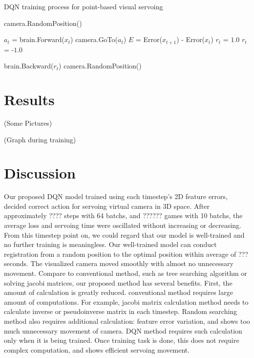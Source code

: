 \documentclass[10pt]{article}
\begin{document}
 \begin{algorithm}
   \caption{DQN training process for point-based visual servoing}\label{euclid}
   \begin{algorithmic}[1]

     \State camera.RandomPosition()



     \State $a_t$ = brain.Forward($x_t$)
     \State camera.GoTo($a_t$)
     \State $E$ = Error($x_{t+1}$) - Error($x_t$)
     \State $r_t$ = $1.0$
     \Else
     \State $r_t$ = -$1.0$
     \EndIf

     brain.Backward($r_t$)
     camera.RandomPosition()
     \EndIf

     \EndFor

   \end{algorithmic}
 \end{algorithm}


\section{Results}
(Some Pictures)

(Graph during training)



\section{Discussion}
 Our proposed DQN model trained using each timestep's 2D feature errors, decided correct action for servoing virtual camera in 3D space. After approximately ???? steps with 64 batchs, and ?????? games with 10 batchs, the average loss and servoing time were oscillated without increasing or decreasing. From this timestep point on, we could regard that our model is well-trained and no further training is meaningless. Our well-trained model can conduct registration from a random position to the optimal position within average of ??? seconds. The visualized camera moved smoothly with almost no unnecessary movement. Compare to conventional method, such as tree searching algorithm or solving jacobi matrices, our proposed method has several benefits. First, the amount of calculation is greatly reduced. conventional method requires large amount of computations. For example, jacobi matrix calculation method needs to calculate inverse or pseudoinverse matrix in each timestep. Random searching method also requires additional calculation: feature error variation, and shows too much unnecessary movement of camera. DQN method requires such calculation only when it is being trained. Once training task is done, this does not require complex computation, and shows efficient servoing movement.
\end{document}
